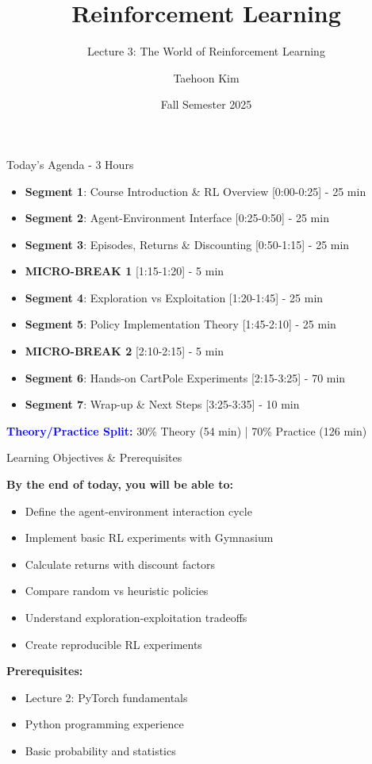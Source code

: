 \documentclass[aspectratio=169,10pt]{beamer}
\title{Reinforcement Learning}
\subtitle{Lecture 3: The World of Reinforcement Learning}
\author{Taehoon Kim}
\institute{Sogang University MIMIC Lab \\ \url{https://mimic-lab.com}}
\date{Fall Semester 2025}
\begin{document}
\begin{frame}[plain]
    \titlepage
\end{frame}

\begin{frame}{Today's Agenda - 3 Hours}
\begin{itemize}
    \item \textbf{Segment 1}: Course Introduction \& RL Overview [0:00-0:25] - 25 min
    \item \textbf{Segment 2}: Agent-Environment Interface [0:25-0:50] - 25 min
    \item \textbf{Segment 3}: Episodes, Returns \& Discounting [0:50-1:15] - 25 min
    \item \textbf{MICRO-BREAK 1} [1:15-1:20] - 5 min
    \item \textbf{Segment 4}: Exploration vs Exploitation [1:20-1:45] - 25 min
    \item \textbf{Segment 5}: Policy Implementation Theory [1:45-2:10] - 25 min
    \item \textbf{MICRO-BREAK 2} [2:10-2:15] - 5 min
    \item \textbf{Segment 6}: Hands-on CartPole Experiments [2:15-3:25] - 70 min
    \item \textbf{Segment 7}: Wrap-up \& Next Steps [3:25-3:35] - 10 min
\end{itemize}

\vfill
\textcolor{blue}{\textbf{Theory/Practice Split:}} 30\% Theory (54 min) | 70\% Practice (126 min)
\end{frame}

\begin{frame}{Learning Objectives \& Prerequisites}

\textbf{By the end of today, you will be able to:}
\begin{itemize}
    \item Define the agent-environment interaction cycle
    \item Implement basic RL experiments with Gymnasium
    \item Calculate returns with discount factors
    \item Compare random vs heuristic policies
    \item Understand exploration-exploitation tradeoffs
    \item Create reproducible RL experiments
\end{itemize}

\vfill

\textbf{Prerequisites:}
\begin{itemize}
    \item Lecture 2: PyTorch fundamentals
    \item Python programming experience
    \item Basic probability and statistics
\end{itemize}

\end{frame}
\end{document}
